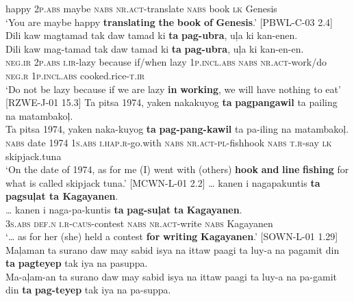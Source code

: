 happy  2\textsc{p.abs}  maybe  \textsc{nabs}  \textsc{nr.act}-translate  \textsc{nabs}  book  \textsc{lk}  Genesis \\
\glt ‘You are maybe happy \textbf{translating} \textbf{the} \textbf{book} \textbf{of} \textbf{Genesis}.’ [PBWL-C-03 2.4]
\z
\ea
Dili  kaw  magtamad  tak  daw  tamad  ki \textbf{ta}  \textbf{pag-ubra},  uļa  ki  kan-enen. \smallskip\\
\gll Dili  kaw  mag-tamad  tak  daw  tamad  ki \textbf{ta}  \textbf{pag-ubra},  uļa  ki  kan-en-en. \\
\textsc{neg.ir}  2\textsc{p.abs}  \textsc{i.ir}-lazy  because  if/when  lazy  1\textsc{p.incl.abs}
\textsc{nabs}  \textsc{nr.act}-work/do  \textsc{neg.r}  1\textsc{p.incl.abs}  cooked.rice-\textsc{t.ir} \\
\glt ‘Do not be lazy because if we are lazy \textbf{in} \textbf{working}, we will have nothing to eat’ [RZWE-J-01 15.3]
\z
\ea
Ta  pitsa  1974,  yaken  nakakuyog  \textbf{ta}  \textbf{pagpangawil} ta  pailing  na  matambakoļ. \smallskip\\
\gll Ta  pitsa  1974,  yaken  naka-kuyog  \textbf{ta}  \textbf{pag-pang-kawil} ta  pa-iling  na  matambakoļ. \\
\textsc{nabs}  date  1974  1\textsc{s.abs}  \textsc{i.hap.r}-go.with  \textsc{nabs}  \textsc{nr.act}-\textsc{pl}-fishhook
\textsc{nabs}  \textsc{t.r}-say  \textsc{lk}  skipjack.tuna \\
\glt ‘On the date of 1974, as for me (I) went with (others) \textbf{hook} \textbf{and} \textbf{line} \textbf{fishing} for what is called skipjack tuna.’ [MCWN-L-01 2.2]
\z
\ea
… kanen  i  nagapakuntis  \textbf{ta}  \textbf{pagsuļat  ta  Kagayanen}. \smallskip\\
\gll … kanen  i  naga-pa-kuntis  \textbf{ta}  \textbf{pag-suļat}  \textbf{ta}  \textbf{Kagayanen}. \\
{} 3\textsc{s.abs}  \textsc{def.n}  \textsc{i.r}-\textsc{caus}-contest  \textsc{nabs}  \textsc{nr.act}-write  \textsc{nabs}  Kagayanen \\
\glt ‘… as for her (she) held a contest \textbf{for} \textbf{writing} \textbf{Kagayanen}.’ [SOWN-L-01 1.29]
\z
\ea
Maļaman  ta  surano  daw  may  sabid isya  na  ittaw  paagi  ta  luy-a  na  pagamit  din  \textbf{ta} \textbf{pagteyep}  tak  iya  na  pasuppa. \smallskip\\
\gll Ma-aļam-an  ta  surano  daw  may  sabid isya  na  ittaw  paagi  ta  luy-a  na  pa-gamit  din  \textbf{ta} \textbf{pag-teyep}  tak  iya  na  pa-suppa. \\
